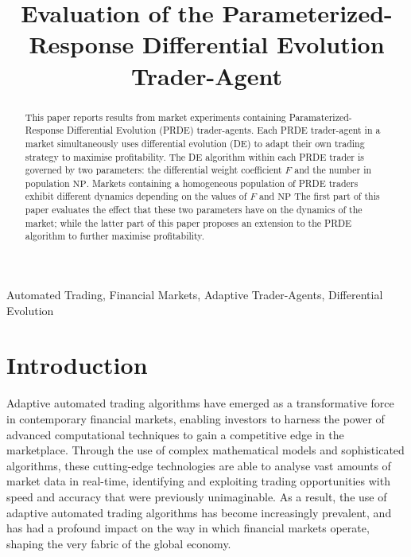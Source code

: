 \documentclass[conference]{IEEEtran}
\begin{document}
\title{Evaluation of the Parameterized-Response Differential Evolution Trader-Agent}

\author{
}

\maketitle

\begin{abstract}
This paper reports results from market experiments containing Paramaterized-Response Differential Evolution (PRDE) trader-agents.
Each PRDE trader-agent in a market simultaneously uses differential evolution (DE) to adapt their own trading strategy to maximise profitability.
The DE algorithm within each PRDE trader is governed by two parameters: the differential weight coefficient $F$ and the number in population $\mathrm{NP}$.
Markets containing a homogeneous population of PRDE traders exhibit different dynamics depending on the values of $F$ and $\mathrm{NP}$
The first part of this paper evaluates the effect that these two parameters have on the dynamics of the market; while the latter part of this paper proposes an extension to the PRDE algorithm to further maximise profitability.
\end{abstract}

\begin{IEEEkeywords}
Automated Trading, Financial Markets, Adaptive Trader-Agents, Differential Evolution
\end{IEEEkeywords}

\section{Introduction}

Adaptive automated trading algorithms have emerged as a transformative force in contemporary financial markets, enabling investors to harness the power of advanced computational techniques to gain a competitive edge in the marketplace.
Through the use of complex mathematical models and sophisticated algorithms, these cutting-edge technologies are able to analyse vast amounts of market data in real-time, identifying and exploiting trading opportunities with speed and accuracy that were previously unimaginable.
As a result, the use of adaptive automated trading algorithms has become increasingly prevalent, and has had a profound impact on the way in which financial markets operate, shaping the very fabric of the global economy.
\end{document}
